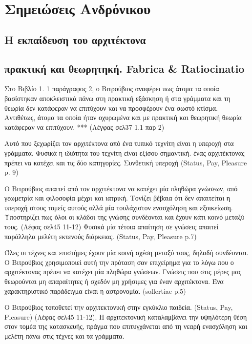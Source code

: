 
\section{Σημειώσεις Ανδρόνικου}



\subsection{Η εκπαίδευση του αρχιτέκτονα}

\subsection{πρακτική και θεωρητηκή. Fabrica \& Ratiocinatio}

Στο Βιβλίο 1. 1 παράγραφος 2, ο Βιτρούβιος αναφέρει πως άτομα τα οποία 
βασίστηκαν αποκλειστικά πάνω στη πρακτική εξάσκηση ή  στα γράμματα και τη 
θεωρία δεν κατάφεραν να επιτύχουν και να προσφέρουν ένα σωστό κτίσμα. 
Αντιθέτως, άτομα τα οποία ήταν οχυρωμένα και με πρακτική και θεωρητική θεωρία 
κατάφεραν να επιτύχουν. *** (Λέγφας σελ37 1.1 παρ 2)

Αυτό που ξεχωρίζει τον αρχιτέκτονα από ένα τυπικό τεχνίτη είναι η υπεροχή στα 
γράμματα. Φυσικά η ιδιότητα του τεχνίτη είναι εξίσου σημαντική. ένας 
αρχιτέκτονας πρέπει να κατέχει και τις δύο κατηγορίες. Συνθετική υπεροχή 
(Status, Pay, Pleasure p. 9)

Ο Βιτρούβιος απαιτεί από τον αρχιτέκτονα να κατέχει μία πληθώρα γνώσεων, από 
γεωμετρία και φιλοσοφία μέχρι και ιατρική. Τονίζει βέβαια ότι δεν απαιτείται η 
υπεροχή στους τομείς αυτούς αλλά μία τουλάχιστον ενασχόληση και εξοικείωση. 
Υποστηρίζει πως όλοι οι κλάδοι της γνώσης συνδέονται και έχουν κάτι κοινό 
μεταξύ τους. (Λέφας σελ45 11-12)
Φυσικά μία τέτοια απαίτηση σε γνώσεις απαιτεί παράλληλα μελέτη εκτενούς 
διάρκειας. (Status, Pay, Pleasure p.7)

Όλες οι τέχνες και επιστήμες έχουν μία κοινή σχέση μεταξύ τους, δηλαδή 
συνδέονται. Ο Βιτρούβιος χρησιμοποιεί αυτή την πρόταση σαν επιχείρημα για το 
λόγω που ο αρχιτέκτονας πρέπει να κατέχει μία πληθώρα γνώσεων. Γνώσεις που 
στις μέρες μας θεωρούνται μη απαραίτητες ή σχεδόν μη χρήσιμες για έναν 
αρχιτέκτονα. Ένα χαρακτηριστικό παράδειγμα είναι η αστρονομία. (sollertiae p.5)

Ο Βιτρούβιος τοποθετεί την αρχιτεκτονική στην εγκύκλιο παιδεία. (Status, Pay, 
Pleasure) (Λέφας σελ45 11-12). Η αρχιτεκτονική καταλαμβάνει την υψηλότερη θέση 
στον τομέα της κατασκευής, πράγμα που επιτυγχάνεται από τη νεαρή ενασχόληση και 
μελέτη πάνω στις τέχνες και τα γράμματα.

